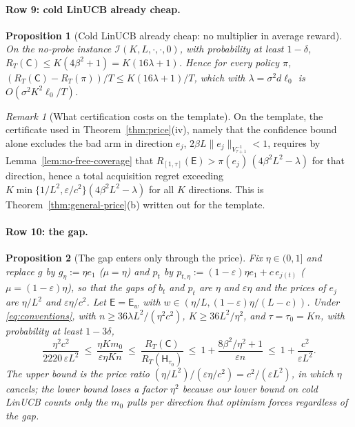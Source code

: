\documentclass{article}
\newtheorem{proposition}{Proposition}
\theoremstyle{definition}
\theoremstyle{remark}
\newtheorem{remark}{Remark}
\newcommand{\eps}{\varepsilon}
\theoremstyle{remark}
\newcommand{\Cold}{\mathsf{C}}
\newcommand{\Exp}{\mathsf{E}}
\newcommand{\Hyb}{\mathsf{H}}
\begin{document}
\paragraph{Row 9: cold LinUCB already cheap.}
\begin{proposition}[Cold LinUCB already cheap: no multiplier in average reward]
\label{prop:cat-cheap}
On the no-probe instance $\mathcal I(K,L,\cdot,\cdot,0)$, with probability
at least $1-\delta$, $R_T(\Cold)\le K(4\beta^2+1)=K(16\lambda+1)$. Hence for
\emph{every} policy $\pi$, $(R_T(\Cold)-R_T(\pi))/T\le K(16\lambda+1)/T$, which with
$\lambda=\sigma^2d\ell_0$ is $O(\sigma^2K^2\ell_0/T)$.
\end{proposition}

\begin{remark}[What certification costs on the template]
On the template, the certificate used in Theorem~\ref{thm:price}(iv), namely
that the confidence bound alone excludes the bad arm in direction $e_j$,
$2\beta L\|e_j\|_{V_{\tau+1}^{-1}}<1$, requires by
Lemma~\ref{lem:no-free-coverage} that
$R_{[1,\tau]}(\Exp)>\pi(e_j)\,(4\beta^2L^2-\lambda)$ for that direction, hence
a total acquisition regret exceeding
$K\min\{1/L^2,\eps/c^2\}(4\beta^2L^2-\lambda)$ for all $K$ directions. This is
Theorem~\ref{thm:general-price}(b) written out for the template.
\end{remark}

\paragraph{Row 10: the gap.}
\begin{proposition}[The gap enters only through the price]
\label{prop:cat-gap}
Fix $\eta\in(0,1]$ and replace $g$ by $g_\eta:=\eta e_1$ ($\mu=\eta$) and
$p_t$ by $p_{t,\eta}:=(1-\eps)\eta e_1+c\,e_{j(t)}$ ($\mu=(1-\eps)\eta$), so that
the gaps of $b_t$ and $p_t$ are $\eta$ and $\eps\eta$ and the prices of
$e_j$ are $\eta/L^2$ and $\eps\eta/c^2$. Let $\Exp=\Exp_w$ with
$w\in(\eta/L,(1-\eps)\eta/(L-c))$. Under \eqref{eq:conventions}, with
$n\ge36\lambda L^2/(\eta^2c^2)$, $K\ge36L^2/\eta^2$, and $\tau=\tau_0=Kn$, with
probability at least $1-3\delta$,
\[
\frac{\eta^2c^2}{2220\,\eps L^2}\ \le\ \frac{\eta Km_0}{\eps\eta Kn}\ \le\
\frac{R_T(\Cold)}{R_T(\Hyb_{\tau_0})}\ \le\ 1+\frac{8\beta^2/\eta^2+1}{\eps n}\ \le\ 1+\frac{c^2}{\eps L^2}.
\]
The upper bound is the price ratio $(\eta/L^2)/(\eps\eta/c^2)=c^2/(\eps L^2)$,
in which $\eta$ cancels; the lower bound loses a factor $\eta^2$ because our
lower bound on cold LinUCB counts only the $m_0$ pulls per direction that
optimism forces regardless of the gap.
\end{proposition}
\end{document}
